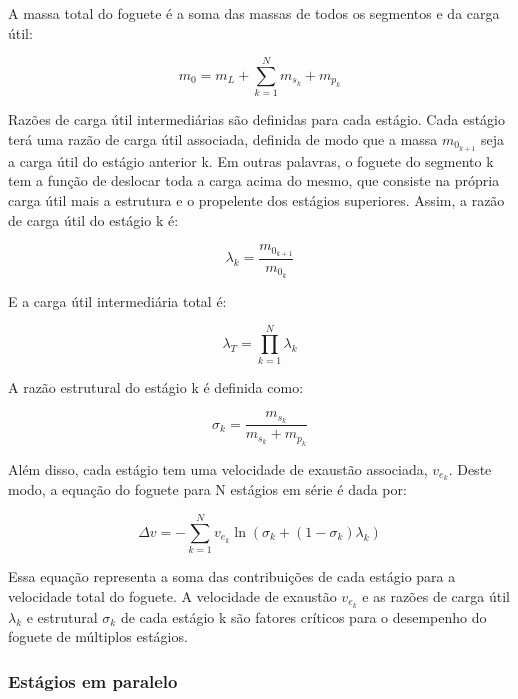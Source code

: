 \par A massa total do foguete é a soma das massas de todos os segmentos e da carga útil:

\begin{equation}
m_0 = m_L + \sum_{k=1}^{N} m_{s_k} + m_{p_k}
\end{equation}

\par Razões de carga útil intermediárias são definidas para cada estágio. Cada estágio terá uma razão de carga útil associada, definida de modo que a massa $m_{0_{k+1}}$ seja a carga útil do estágio anterior k. Em outras palavras, o foguete do segmento k tem a função de deslocar toda a carga acima do mesmo, que consiste na própria carga útil mais a estrutura e o propelente dos estágios superiores. Assim, a razão de carga útil do estágio k é:

\begin{equation}
\lambda_k = \frac{m_{0_{k+1}}}{m_{0_k}}
\end{equation}

E a carga útil intermediária total é:

\begin{equation}
\lambda_T = \prod_{k=1}^{N} \lambda_k
\end{equation}

A razão estrutural do estágio k é definida como:

\begin{equation}
\sigma_k = \frac{m_{s_k}}{m_{s_k} + m_{p_k}}
\end{equation}

\par Além disso, cada estágio tem uma velocidade de exaustão associada, $v_{e_k}$. Deste modo, a equação do foguete para N estágios em série é dada por:

\begin{equation}
\Delta v = -\sum_{k=1}^{N} v_{e_k} \ln \left(\sigma_k + (1 - \sigma_k) \lambda_k\right)
\end{equation}

\par Essa equação representa a soma das contribuições de cada estágio para a velocidade total do foguete. A velocidade de exaustão $v_{e_k}$ e as razões de carga útil $\lambda_k$ e estrutural $\sigma_k$ de cada estágio k são fatores críticos para o desempenho do foguete de múltiplos estágios.

\subsubsection{Estágios em paralelo}

